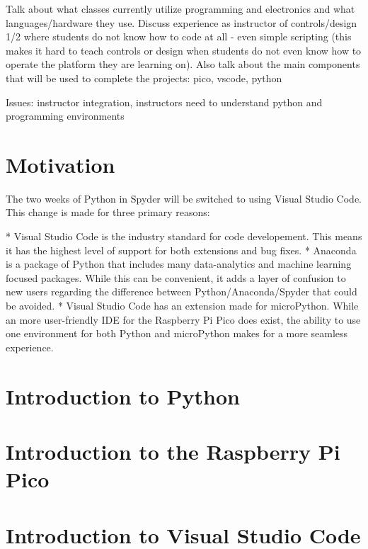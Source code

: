 Talk about what classes currently utilize programming and electronics 
and what languages/hardware they use. Discuss experience as instructor 
of controls/design 1/2 where students do not know how to code at 
all - even simple scripting (this makes it hard to teach controls or 
design when students do not even know how to operate the platform they
are learning on). Also talk about the main components that will be 
used to complete the projects: pico, vscode, python


Issues: instructor integration, instructors need to understand python
and programming environments

\section{Motivation}

The two weeks of Python in Spyder will be switched to using Visual Studio Code. This change is made for three primary reasons:

* Visual Studio Code is the industry standard for code developement. This means it has the highest level of support for both extensions and bug fixes.
* Anaconda is a package of Python that includes many data-analytics and machine learning focused packages. While this can be convenient, it adds a layer of confusion to new users regarding the difference between Python/Anaconda/Spyder that could be avoided.
* Visual Studio Code has an extension made for microPython. While an more user-friendly IDE for the Raspberry Pi Pico does exist, the ability to use one environment for both Python and microPython makes for a more seamless experience.

\section{Introduction to Python}

\section{Introduction to the Raspberry Pi Pico}

\section{Introduction to Visual Studio Code}